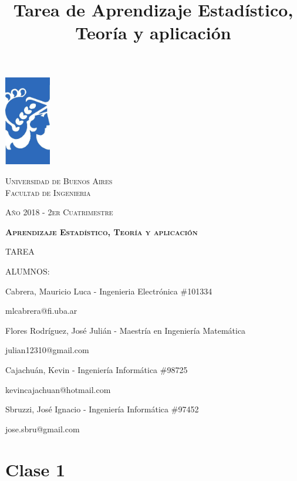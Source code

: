 \documentclass[12pt, a4paper]{article}
\title{Tarea de Aprendizaje Estadístico, Teoría y aplicación}
\author{}
\date{}
\begin{document}
\begin{titlepage} %
	\centering
	  \includegraphics[width=0.15\textwidth]{FIUBA_logo}\par
	  {\scshape\Large Universidad de Buenos Aires
      \\ Facultad de Ingenieria \par}
      {\scshape\small Año 2018 - 2er Cuatrimestre \par}
	  \vspace{1cm}
	  {\scshape\bfseries\LARGE Aprendizaje Estadístico, Teoría y aplicación\par}
	  \vspace{0.5cm}
	  \vspace{1cm}
      {\scshape\large TAREA \par}
      \vspace{0.5cm
      \raggedright}
      {\scshape\large  ALUMNOS: \par}
      \vspace{0.5cm}
    \centering
      {\normalsize  Cabrera, Mauricio Luca - Ingenieria Electrónica \#101334 \par}
      {\small  mlcabrera@fi.uba.ar \par}
	  {\normalsize Flores Rodríguez, José Julián - Maestría en Ingeniería Matemática \par}
      {\small  julian12310@gmail.com \par}
	  {\normalsize Cajachuán, Kevin - Ingeniería Informática \#98725 \par}
      {\small  kevincajachuan@hotmail.com \par}
	  {\normalsize Sbruzzi, José Ignacio - Ingeniería Informática \#97452 \par}
      {\small  jose.sbru@gmail.com \par}
\end{titlepage} %
\newpage
\tableofcontents
\newpage
\section{Clase 1}
\end{document}
